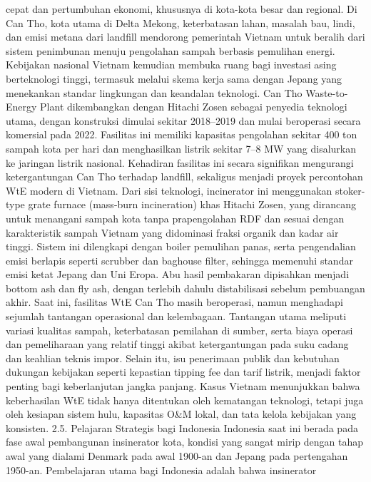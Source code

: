 \documentclass[
  letterpaper,
  DIV=11,
  numbers=noendperiod]{scrreprt}
\begin{document}
cepat dan pertumbuhan ekonomi, khususnya di kota-kota besar dan
regional. Di Can Tho, kota utama di Delta Mekong, keterbatasan lahan,
masalah bau, lindi, dan emisi metana dari landfill mendorong pemerintah
Vietnam untuk beralih dari sistem penimbunan menuju pengolahan sampah
berbasis pemulihan energi. Kebijakan nasional Vietnam kemudian membuka
ruang bagi investasi asing berteknologi tinggi, termasuk melalui skema
kerja sama dengan Jepang yang menekankan standar lingkungan dan
keandalan teknologi. Can Tho Waste-to-Energy Plant dikembangkan dengan
Hitachi Zosen sebagai penyedia teknologi utama, dengan konstruksi
dimulai sekitar 2018--2019 dan mulai beroperasi secara komersial pada
2022. Fasilitas ini memiliki kapasitas pengolahan sekitar 400 ton sampah
kota per hari dan menghasilkan listrik sekitar 7--8 MW yang disalurkan
ke jaringan listrik nasional. Kehadiran fasilitas ini secara signifikan
mengurangi ketergantungan Can Tho terhadap landfill, sekaligus menjadi
proyek percontohan WtE modern di Vietnam. Dari sisi teknologi,
incinerator ini menggunakan stoker-type grate furnace (mass-burn
incineration) khas Hitachi Zosen, yang dirancang untuk menangani sampah
kota tanpa prapengolahan RDF dan sesuai dengan karakteristik sampah
Vietnam yang didominasi fraksi organik dan kadar air tinggi. Sistem ini
dilengkapi dengan boiler pemulihan panas, serta pengendalian emisi
berlapis seperti scrubber dan baghouse filter, sehingga memenuhi standar
emisi ketat Jepang dan Uni Eropa. Abu hasil pembakaran dipisahkan
menjadi bottom ash dan fly ash, dengan terlebih dahulu distabilisasi
sebelum pembuangan akhir. Saat ini, fasilitas WtE Can Tho masih
beroperasi, namun menghadapi sejumlah tantangan operasional dan
kelembagaan. Tantangan utama meliputi variasi kualitas sampah,
keterbatasan pemilahan di sumber, serta biaya operasi dan pemeliharaan
yang relatif tinggi akibat ketergantungan pada suku cadang dan keahlian
teknis impor. Selain itu, isu penerimaan publik dan kebutuhan dukungan
kebijakan seperti kepastian tipping fee dan tarif listrik, menjadi
faktor penting bagi keberlanjutan jangka panjang. Kasus Vietnam
menunjukkan bahwa keberhasilan WtE tidak hanya ditentukan oleh
kematangan teknologi, tetapi juga oleh kesiapan sistem hulu, kapasitas
O\&M lokal, dan tata kelola kebijakan yang konsisten. 2.5. Pelajaran
Strategis bagi Indonesia Indonesia saat ini berada pada fase awal
pembangunan insinerator kota, kondisi yang sangat mirip dengan tahap
awal yang dialami Denmark pada awal 1900-an dan Jepang pada pertengahan
1950-an. Pembelajaran utama bagi Indonesia adalah bahwa insinerator
\end{document}

